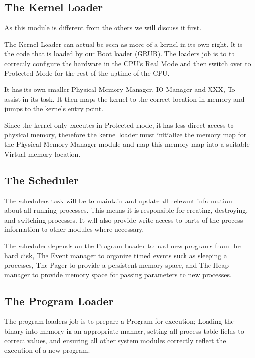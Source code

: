 \documentclass[a4paper]{report}
\begin{document}
\subsection{The Kernel Loader}

As this module is different from the others we will discuss it first.

The Kernel Loader can actual be seen as more of a kernel in its own right. It is the code that is loaded by our Boot loader (GRUB). The loaders job is to to correctly configure the hardware in the CPU's Real Mode and then switch over to Protected Mode for the rest of the uptime of the CPU.

It has its own smaller Physical Memory Manager, IO Manager and XXX, To assist in its task. It then maps the kernel to the correct location in memory and jumps to the kernels entry point.

Since the kernel only executes in Protected mode, it has less direct access to physical memory, therefore the kernel loader must initialize the memory map for the Physical Memory Manager module and map this memory map into a suitable Virtual memory location.

\subsection{The Scheduler}

The schedulers task will be to maintain and update all relevant information about all running processes. This means it is responsible for creating, destroying, and switching processes. It will also provide write access to parts of the process information to other modules where necessary.

The scheduler depends on the Program Loader to load new programs from the hard disk, The Event manager to organize timed events such as sleeping a processes, The Pager to provide a persistent memory space, and The Heap manager to provide memory space for passing parameters to new processes.

\subsection{The Program Loader}

The program loaders job is to prepare a Program for execution; Loading the binary into memory in an appropriate manner, setting all process table fields to correct values, and ensuring all other system modules correctly reflect the execution of a new program.
\end{document}
